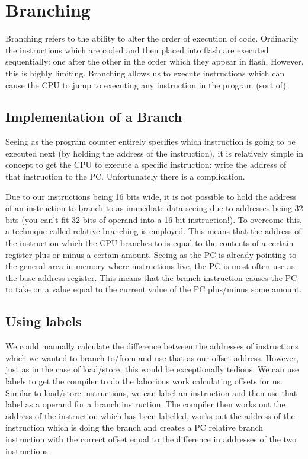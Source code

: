 \chapter{Branching}
Branching refers to the ability to alter the order of execution of code. Ordinarily the instructions which are coded and then placed into flash are executed sequentially: one after the other in the order which they appear in flash. However, this is highly limiting. Branching allows us to execute instructions which can cause the CPU to jump to executing any instruction in the program (sort of). 

\section{Implementation of a Branch}
Seeing as the program counter entirely specifies which instruction is going to be executed next (by holding the address of the instruction), it is relatively simple in concept to get the CPU to execute a specific instruction: write the address of that instruction to the PC. Unfortunately there is a complication.

Due to our instructions being 16 bits wide, it is not possible to hold the address of an instruction to branch to as immediate data seeing due to addresses being 32 bits (you can't fit 32 bits of operand into a 16 bit instruction!).
To overcome this, a technique called relative branching is employed. This means that the address of the instruction which the CPU branches to is equal to the contents of a certain register plus or minus a certain amount. Seeing as the PC is already pointing to the general area in memory where instructions live, the PC is most often use as the base address register. This means that the branch instruction causes the PC to take on a value equal to the current value of the PC plus/minus some amount. 

\section{Using labels}
We could manually calculate the difference between the addresses of instructions which we wanted to branch to/from and use that as our offset address. However, just as in the case of load/store, this would be exceptionally tedious. We can use labels to get the compiler to do the laborious work calculating offsets for us. Similar to load/store instructions, we can label an instruction and then use that label as a operand for a branch instruction. The compiler then works out the address of the instruction which has been labelled, works out the address of the instruction which is doing the branch and creates a PC relative branch instruction with the correct offset equal to the difference in addresses of the two instructions. 

